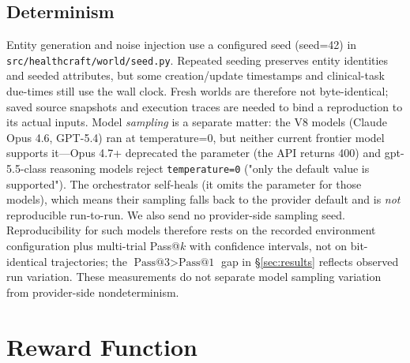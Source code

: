 \subsection{Determinism}
\label{sec:determinism}
Entity generation and noise injection use a configured
seed (seed=42)  %
in \texttt{src/healthcraft/world/seed.py}. Repeated seeding preserves
entity identities and seeded attributes, but some creation/update timestamps
and clinical-task due-times still use the wall clock. Fresh worlds are
therefore not byte-identical; saved source snapshots and execution traces
are needed to bind a reproduction to its actual inputs. Model \emph{sampling}
is a separate matter:
the V8 models (Claude Opus 4.6, GPT-5.4) ran at temperature=0,  %
but neither current frontier model supports it---Opus 4.7+ deprecated
the parameter (the API returns 400) and gpt-5.5-class reasoning models
reject \texttt{temperature=0} ("only the default value is supported").
The orchestrator self-heals (it omits the parameter for those models),
which means their sampling falls back to the provider default and is
\emph{not} reproducible run-to-run. We also send no provider-side
sampling seed. Reproducibility for such models therefore rests on the
recorded environment configuration plus multi-trial Pass@$k$ with confidence intervals,
not on bit-identical trajectories; the $\text{Pass@3} > \text{Pass@1}$
gap in \S\ref{sec:results} reflects observed run variation. These measurements
do not separate model sampling variation from provider-side nondeterminism.

\section{Reward Function}
\label{sec:reward}


